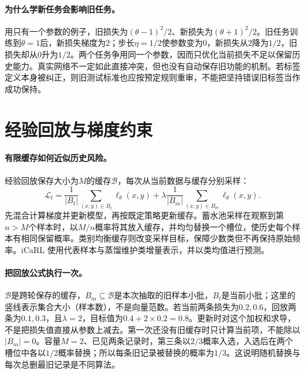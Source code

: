 \paragraph{为什么学新任务会影响旧任务。}
用只有一个参数的例子，旧损失为$(\theta-1)^2/2$、新损失为$(\theta+1)^2/2$。旧任务训练到$\theta=1$后，新损失梯度为$2$；步长$\eta=1/2$使参数变为$0$，新损失从$2$降为$1/2$，旧损失却从$0$升为$1/2$。两个任务争用同一个参数，因而只优化当前损失不足以保留历史能力。真实网络不一定如此直接冲突，但也没有自动保存旧功能的机制。若标签定义本身被纠正，则旧测试标准也应按预定规则重审，不能把坚持错误旧标签当作成功保持。

\section{经验回放与梯度约束}
\paragraph{有限缓存如何近似历史风险。}
经验回放保存大小为$M$的缓存$\mathcal B$，每次从当前数据与缓存分别采样：
\begin{equation}
 \mathcal L_t=\frac1{|B_t|}\sum_{(x,y)\in B_t}\ell_\theta(x,y)
 +\lambda\frac1{|B_m|}\sum_{(x,y)\in B_m}\ell_\theta(x,y).\label{eq:continual-replay-objective}
\end{equation}
先混合计算梯度并更新模型，再按既定策略更新缓存。蓄水池采样在观察到第$n>M$个样本时，以$M/n$概率将其放入缓存，并均匀替换一个槽位，使历史每个样本有相同保留概率。类别均衡缓存则改变采样目标，保障少数类但不再保持原始频率。iCaRL 使用代表样本与蒸馏维护类增量表示，并以类均值进行预测\cite{rebuffi2017icarl}。

\paragraph{把回放公式执行一次。}
$\mathcal B$是跨轮保存的缓存，$B_m\subseteq\mathcal B$是本次抽取的旧样本小批，$B_t$是当前小批；这里的竖线表示集合大小（样本数），不是向量范数。若当前两条损失为$0.2,0.6$，回放两条为$0.1,0.3$，且$\lambda=2$，目标值为$0.4+2\times0.2=0.8$。更新时对这个加权和求导，不是把损失值直接从参数上减去。第一次还没有旧缓存时只计算当前项，不能除以$|B_m|=0$。容量$M=2$、已见两条记录时，第三条以$2/3$概率入选，入选后在两个槽位中各以$1/2$概率替换；所以每条旧记录被替换的概率为$1/3$。这说明随机替换与每次总删最旧记录是不同算法。

